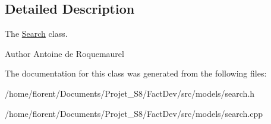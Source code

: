 \subsection{Detailed Description}
The \hyperlink{classSearch}{Search} class. 

\begin{DoxyAuthor}{Author}
Antoine de Roquemaurel 
\end{DoxyAuthor}


The documentation for this class was generated from the following files\-:\begin{DoxyCompactItemize}
\item 
/home/florent/\-Documents/\-Projet\-\_\-\-S8/\-Fact\-Dev/src/models/search.\-h\item 
/home/florent/\-Documents/\-Projet\-\_\-\-S8/\-Fact\-Dev/src/models/search.\-cpp\end{DoxyCompactItemize}
